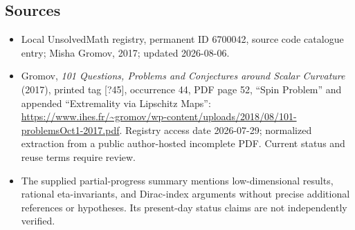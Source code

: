 \documentclass[11pt]{article}
\begin{document}
\subsection{Sources}
\begin{itemize}
\item Local UnsolvedMath registry, permanent ID 6700042, source code catalogue entry; Misha Gromov, 2017; updated 2026-08-06.
\item Gromov, \emph{101 Questions, Problems and Conjectures around Scalar Curvature} (2017), printed tag [?45], occurrence 44, PDF page 52, ``Spin Problem'' and appended ``Extremality via Lipschitz Maps'': \url{https://www.ihes.fr/~gromov/wp-content/uploads/2018/08/101-problemsOct1-2017.pdf}. Registry access date 2026-07-29; normalized extraction from a public author-hosted incomplete PDF. Current status and reuse terms require review.
\item The supplied partial-progress summary mentions low-dimensional results, rational eta-invariants, and Dirac-index arguments without precise additional references or hypotheses. Its present-day status claims are not independently verified.
\end{itemize}
\end{document}
